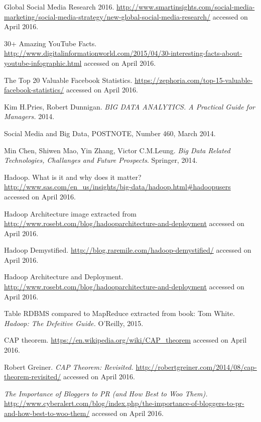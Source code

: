 \begin{thebibliography}{99999}
\singlespace\normalsize

 Global Social Media Research 2016. \url{http://www.smartinsights.com/social-media-marketing/social-media-strategy/new-global-social-media-research/} accessed on April 2016.

 30+ Amazing YouTube Facts. \url{http://www.digitalinformationworld.com/2015/04/30-interesting-facts-about-youtube-infographic.html} accessed on April 2016.

 The Top 20 Valuable Facebook Statistics. \url{https://zephoria.com/top-15-valuable-facebook-statistics/} accessed on April 2016.

 Kim H.Pries, Robert Dunnigan. \textit{BIG DATA ANALYTICS. A Practical Guide for Managers.} 2014.

 Social Media and Big Data, POSTNOTE, Number 460, March 2014.

 Min Chen, Shiwen Mao, Yin Zhang, Victor C.M.Leung. \textit{Big Data Related Technologies, Challanges and Future Prospects}. Springer, 2014.

 Hadoop. What is it and why does it matter? \url{http://www.sas.com/en_us/insights/big-data/hadoop.html#hadoopusers} accessed on April 2016.

 Hadoop Architecture image extracted from \url{http://www.rosebt.com/blog/hadooparchitecture-and-deployment} accessed on April 2016.

 Hadoop Demystified. \url{http://blog.raremile.com/hadoop-demystified/} accessed on April 2016.

 Hadoop Architecture and Deployment. \url{http://www.rosebt.com/blog/hadooparchitecture-and-deployment} accessed on April 2016.

 Table RDBMS compared to MapReduce extracted from book: Tom White. \textit{Hadoop: The Defeitive Guide.} O'Reilly, 2015.

 CAP theorem. \url{https://en.wikipedia.org/wiki/CAP_theorem} accessed on April 2016.

 Robert Greiner. \textit{CAP Theorem: Revisited.} \url{http://robertgreiner.com/2014/08/cap-theorem-revisited/} accessed on April 2016.

\textit{The Importance of Bloggers to PR (and How Best to Woo Them).} \url{http://www.cyberalert.com/blog/index.php/the-importance-of-bloggers-to-pr-and-how-best-to-woo-them/} accessed on April 2016.


\end{thebibliography}
